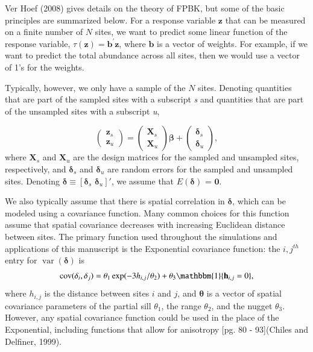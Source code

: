 \documentclass[]{elsarticle} %
\begin{document}
Ver Hoef (2008) gives details on the theory of FPBK, but some of the
basic principles are summarized below. For a response variable
\(\mathbf{z}\) that can be measured on a finite number of \(N\) sites,
we want to predict some linear function of the response variable,
\(\tau(\mathbf{z}) = \mathbf{b}^\prime \mathbf{z}\), where
\(\mathbf{b}\) is a vector of weights. For example, if we want to
predict the total abundance across all sites, then we would use a vector
of 1's for the weights.

Typically, however, we only have a sample of the \(N\) sites. Denoting
quantities that are part of the sampled sites with a subscript \emph{s}
and quantities that are part of the unsampled sites with a subscript
\emph{u},

\begin{equation}
\begin{pmatrix} \label{equation:Zmarginal}
    \mathbf{z}_s      \\
    \mathbf{z}_u
\end{pmatrix}
=
\begin{pmatrix}
  \mathbf{X}_s    \\
  \mathbf{X}_u
\end{pmatrix}
\bm{\beta} +
\begin{pmatrix}
\bm{\delta}_s    \\
\bm{\delta}_u
\end{pmatrix},
\end{equation} where \(\mathbf{X}_s\) and \(\mathbf{X}_u\) are the
design matrices for the sampled and unsampled sites, respectively, and
\(\bm{\delta}_s\) and \(\bm{\delta}_u\) are random errors for the
sampled and unsampled sites. Denoting
\(\bm{\delta} \equiv [\bm{\delta}_s \,\, \bm{\delta}_u]'\), we assume
that \(E(\bm{\delta})\) = \(\mathbf{0}\).

We also typically assume that there is spatial correlation in
\(\bm{\delta}\), which can be modeled using a covariance function. Many
common choices for this function assume that spatial covariance
decreases with increasing Euclidean distance between sites. The primary
function used throughout the simulations and applications of this
manuscript is the Exponential covariance function: the \(i,j^{th}\)
entry for \(\mathop{\mathrm{{var}}}(\bm{\delta})\) is \mbox{}
\begin{align}\label{equation:expcov}
\mathop{\mathrm{{cov}}}(\delta_i, \delta_j) = \theta_1\exp(-3h_{i,j}/\theta_2) + \theta_3\mathbbm{1}\{\mathbf{h}_{i,j} = 0\}, 
\end{align} where \(h_{i,j}\) is the distance between sites \(i\) and
\(j\), and \(\bm{\theta}\) is a vector of spatial covariance parameters
of the partial sill \(\theta_1\), the range \(\theta_2\), and the nugget
\(\theta_3\). However, any spatial covariance function could be used in
the place of the Exponential, including functions that allow for
anisotropy {[}pg. 80 - 93{]}(Chiles and Delfiner, 1999).
\end{document}
